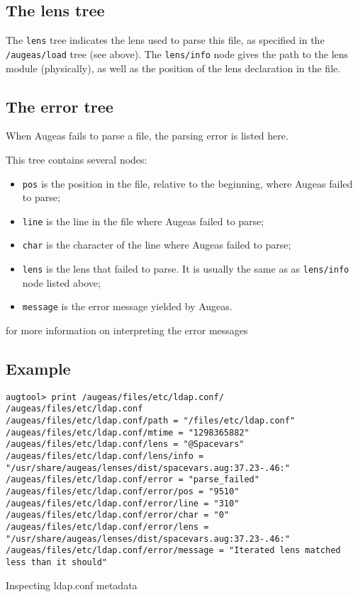 \subsection{The lens tree}

The \verb!lens! tree indicates the lens used to parse this file, as specified in the \nolinkurl{/augeas/load} tree (see above). The \verb!lens/info! node gives the path to the lens module (physically), as well as the position of the lens declaration in the file.

\subsection{The error tree}

When Augeas fails to parse a file, the parsing error is listed here.

This tree contains several nodes:

\begin{itemize}
\item
  \verb!pos! is the position in the file, relative to the beginning, where Augeas failed to parse;
\item
  \verb!line! is the line in the file where Augeas failed to parse;
\item
  \verb!char! is the character of the line where Augeas failed to parse;
\item
  \verb!lens! is the lens that failed to parse. It is usually the same as as \verb!lens/info! node listed above;
\item
  \verb!message! is the error message yielded by Augeas.
\end{itemize}

 for more information on interpreting the error messages


\subsection{Example}

\begin{listing}
  \begin{verbatim}
augtool> print /augeas/files/etc/ldap.conf/
/augeas/files/etc/ldap.conf
/augeas/files/etc/ldap.conf/path = "/files/etc/ldap.conf"
/augeas/files/etc/ldap.conf/mtime = "1298365882"
/augeas/files/etc/ldap.conf/lens = "@Spacevars"
/augeas/files/etc/ldap.conf/lens/info = "/usr/share/augeas/lenses/dist/spacevars.aug:37.23-.46:"
/augeas/files/etc/ldap.conf/error = "parse_failed"
/augeas/files/etc/ldap.conf/error/pos = "9510"
/augeas/files/etc/ldap.conf/error/line = "310"
/augeas/files/etc/ldap.conf/error/char = "0"
/augeas/files/etc/ldap.conf/error/lens = "/usr/share/augeas/lenses/dist/spacevars.aug:37.23-.46:"
/augeas/files/etc/ldap.conf/error/message = "Iterated lens matched less than it should"
  \end{verbatim}
  \caption{Inspecting ldap.conf metadata}
  \label{lst:metadata_ldap_conf}
\end{listing}

